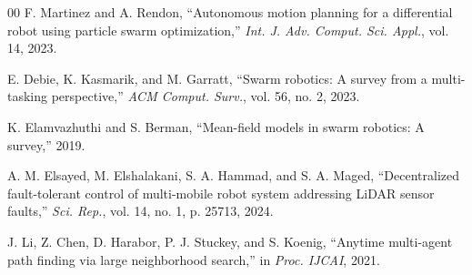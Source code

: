 \documentclass[conference]{IEEEtran}
\begin{document}
\begin{thebibliography}{00}
F. Martinez and A. Rendon,
``Autonomous motion planning for a differential robot using
particle swarm optimization,''
\emph{Int. J. Adv. Comput. Sci. Appl.}, vol. 14, 2023.

E. Debie, K. Kasmarik, and M. Garratt,
``Swarm robotics: A survey from a multi-tasking
perspective,''
\emph{ACM Comput. Surv.}, vol. 56, no. 2, 2023.

K. Elamvazhuthi and S. Berman,
``Mean-field models in swarm robotics: A survey,'' 2019.

A. M. Elsayed, M. Elshalakani, S. A. Hammad, and S. A. Maged,
``Decentralized fault-tolerant control of multi-mobile robot
system addressing LiDAR sensor faults,''
\emph{Sci. Rep.}, vol. 14, no. 1, p. 25713, 2024.

J. Li, Z. Chen, D. Harabor, P. J. Stuckey, and S. Koenig,
``Anytime multi-agent path finding via large neighborhood
search,''
in \emph{Proc. IJCAI}, 2021.

\end{thebibliography}
\end{document}
